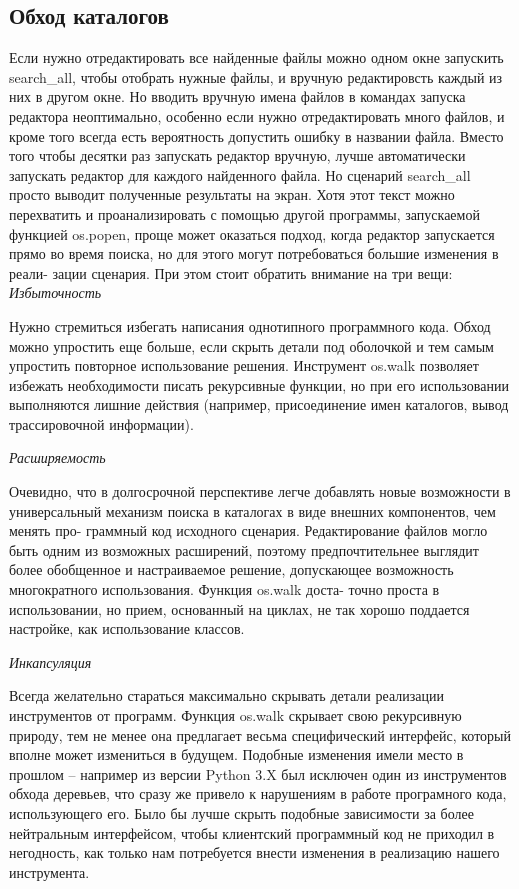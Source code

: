 \documentclass[12pt]{article}
\begin{document}
\subsection{Обход каталогов}
Если нужно отредактировать все найденные файлы можно одном окне
запускить search\_all, чтобы отобрать нужные файлы, и вручную
редактировсть каждый из них в другом окне. Но вводить вручную
имена файлов в командах запуска редактора неоптимально, особенно если нужно отредактировать много файлов, и кроме того всегда есть вероятность допустить ошибку в названии файла. Вместо того чтобы десятки раз запускать
редактор вручную, лучше автоматически запускать редактор для каждого найденного файла.
Но сценарий search\_all просто выводит полученные результаты на экран. Хотя этот текст можно перехватить и проанализировать
с помощью другой программы, запускаемой функцией os.popen, проще
может оказаться подход, когда редактор запускается прямо во время
поиска, но для этого могут потребоваться большие изменения в реали-
зации сценария. При этом стоит обратить внимание на три вещи: \\
\textit{Избыточность}
\begin{adjustwidth}{1em}{}
Нужно стремиться избегать написания однотипного программного кода. Обход можно упростить еще больше, если скрыть детали под оболочкой и тем
самым упростить повторное использование решения. Инструмент
os.walk позволяет избежать необходимости писать рекурсивные
функции, но при его использовании выполняются лишние действия
(например, присоединение имен каталогов, вывод трассировочной
информации).
\end{adjustwidth}
\textit{Расширяемость}
\begin{adjustwidth}{1em}{}
Очевидно, что в долгосрочной перспективе легче добавлять новые возможности в универсальный механизм
поиска в каталогах в виде внешних компонентов, чем менять про-
граммный код исходного сценария. Редактирование файлов могло
быть одним из возможных расширений, поэтому предпочтительнее
выглядит более обобщенное и настраиваемое решение, допускающее
возможность многократного использования. Функция os.walk доста-
точно проста в использовании, но прием, основанный на циклах, не
так хорошо поддается настройке, как использование классов.
\end{adjustwidth}
\textit{Инкапсуляция}
\begin{adjustwidth}{1em}{}
Всегда желательно стараться максимально скрывать детали реализации инструментов
от программ. Функция os.walk скрывает свою рекурсивную природу, тем не менее она предлагает весьма специфический интерфейс,
который вполне может измениться в будущем. Подобные изменения
имели место в прошлом – например из версии Python 3.X был исключен один из инструментов обхода деревьев, что сразу же привело к нарушениям в работе програмного кода, использующего его. Было бы лучше скрыть подобные зависимости за более нейтральным интерфейсом, чтобы клиентский
программный код не приходил в негодность, как только нам потребуется внести изменения в реализацию нашего инструмента.
\end{adjustwidth}
\end{document}
